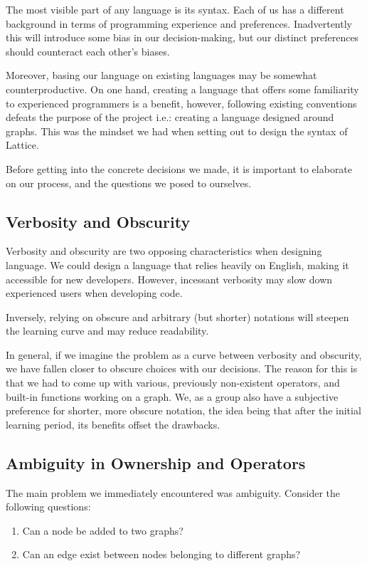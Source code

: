 The most visible part of any language is its syntax.
Each of us has a different background in terms of programming experience and preferences.
Inadvertently this will introduce some bias in our decision-making, but our distinct preferences
should counteract each other's biases.

Moreover, basing our language on existing languages may be somewhat counterproductive.
On one hand, creating a language that offers some familiarity to experienced programmers is a benefit,
however, following existing conventions defeats the purpose of the project i.e.: creating a language designed around graphs.
This was the mindset we had when setting out to design the syntax of Lattice.

Before getting into the concrete decisions we made, it is important to elaborate on our process, and the questions
we posed to ourselves.

\subsection{Verbosity and Obscurity}\label{subsec:syntax_verbostiy_and_obscurity}
Verbosity and obscurity are two opposing characteristics when designing language.
We could design a language that
relies heavily on English, making it accessible for new developers.
However, incessant verbosity may slow down experienced users when developing code.

Inversely, relying on obscure and arbitrary (but shorter) notations will
steepen the learning curve and may reduce readability.

In general, if we imagine the problem as a curve between verbosity and obscurity, we have fallen closer to
obscure choices with our decisions.
The reason for this is that we had to come up with various, previously
non-existent operators, and built-in functions working on a graph.
We, as a group also have a subjective preference for shorter, more obscure notation, the idea being that
after the initial learning period, its benefits offset the drawbacks.


\subsection{Ambiguity in Ownership and Operators}\label{subsec:syntax_ambigoutiy_in_ownership_and_operators}
The main problem we immediately encountered was ambiguity.
Consider the following questions:

\begin{enumerate}
    \item Can a node be added to two graphs?
    \item Can an edge exist between nodes belonging to different graphs?
\end{enumerate}

